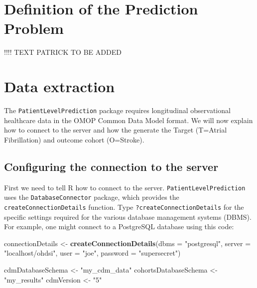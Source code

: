 \documentclass[]{article}
\newenvironment{Shaded}{\begin{snugshade}}{\end{snugshade}}
\newcommand{\KeywordTok}[1]{\textcolor[rgb]{0.13,0.29,0.53}{\textbf{#1}}}
\newcommand{\DataTypeTok}[1]{\textcolor[rgb]{0.13,0.29,0.53}{#1}}
\newcommand{\StringTok}[1]{\textcolor[rgb]{0.31,0.60,0.02}{#1}}
\newcommand{\NormalTok}[1]{#1}
\begin{document}
\section{Definition of the Prediction
Problem}\label{definition-of-the-prediction-problem}

!!!! TEXT PATRICK TO BE ADDED

\section{Data extraction}\label{data-extraction}

The \texttt{PatientLevelPrediction} package requires longitudinal
observational healthcare data in the OMOP Common Data Model format. We
will now explain how to connect to the server and how the generate the
Target (T=Atrial Fibrillation) and outcome cohort (O=Stroke).

\subsection{Configuring the connection to the
server}\label{configuring-the-connection-to-the-server}

First we need to tell R how to connect to the server.
\texttt{PatientLevelPrediction} uses the \texttt{DatabaseConnector}
package, which provides the \texttt{createConnectionDetails} function.
Type \texttt{?createConnectionDetails} for the specific settings
required for the various database management systems (DBMS). For
example, one might connect to a PostgreSQL database using this code:

\begin{Shaded}
\begin{Highlighting}[]
\NormalTok{connectionDetails <-}\StringTok{ }\KeywordTok{createConnectionDetails}\NormalTok{(}\DataTypeTok{dbms =} \StringTok{"postgresql"}\NormalTok{, }
                                             \DataTypeTok{server =} \StringTok{"localhost/ohdsi"}\NormalTok{, }
                                             \DataTypeTok{user =} \StringTok{"joe"}\NormalTok{, }
                                             \DataTypeTok{password =} \StringTok{"supersecret"}\NormalTok{)}

\NormalTok{cdmDatabaseSchema <-}\StringTok{ "my_cdm_data"}
\NormalTok{cohortsDatabaseSchema <-}\StringTok{ "my_results"}
\NormalTok{cdmVersion <-}\StringTok{ "5"}
\end{Highlighting}
\end{Shaded}
\end{document}
